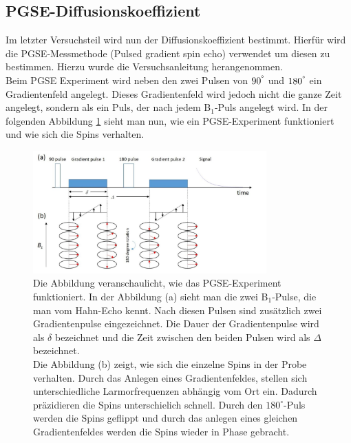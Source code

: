\subsection{PGSE-Diffusionskoeffizient}
Im letzter Versuchsteil wird nun der Diffusionskoeffizient bestimmt. Hierfür wird die PGSE-Messmethode (Pulsed gradient spin echo) verwendet um diesen zu bestimmen.
Hierzu wurde die Versuchsanleitung \cite{PGSE} herangenommen.\\
Beim PGSE Experiment wird neben den zwei Pulsen von $90^{\degree}$ und $180^{\degree}$ ein Gradientenfeld angelegt.
Dieses Gradientenfeld wird jedoch nicht die ganze Zeit angelegt, sondern als ein Puls, der nach jedem B$_1$-Puls angelegt wird.
In der folgenden Abbildung \ref{fig:PGSE} sieht man nun, wie ein PGSE-Experiment funktioniert und wie sich die Spins verhalten. 

\begin{figure}[H]
    \centering
    \includegraphics[width=0.8\textwidth]{Abbildungen/PGSE.JPG}
    \caption[Veranschaulichung der PGSE-Messmethode]{Die Abbildung veranschaulicht, wie das PGSE-Experiment funktioniert.
    In der Abbildung (a) sieht man die zwei B$_1$-Pulse, die man vom Hahn-Echo kennt. Nach diesen Pulsen sind zusätzlich zwei Gradientenpulse eingezeichnet. Die Dauer der Gradientenpulse wird als $\delta$ bezeichnet und die Zeit zwischen den beiden Pulsen wird als $\Delta$ bezeichnet.\\
    Die Abbildung (b) zeigt, wie sich die einzelne Spins in der Probe verhalten. Durch das Anlegen eines Gradientenfeldes, stellen sich unterschiedliche Larmorfrequenzen abhängig vom Ort ein. Dadurch präzidieren die Spins unterschielich schnell. Durch den $180^{\circ}$-Puls werden die Spins geflippt und durch das anlegen eines gleichen Gradientenfeldes werden die Spins wieder in Phase gebracht.   
    \cite{literaturPGSE}}
    \label{fig:PGSE}
\end{figure}

